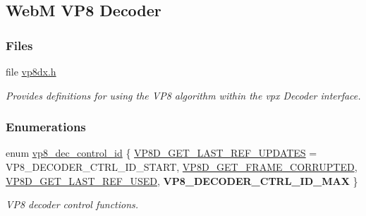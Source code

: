 \hypertarget{group__vp8__decoder}{\subsection{Web\-M V\-P8 Decoder}
\label{group__vp8__decoder}
}
\subsubsection*{Files}
\begin{DoxyCompactItemize}
\item 
file \hyperlink{vp8dx_8h}{vp8dx.\-h}
\begin{DoxyCompactList}\small\item\em Provides definitions for using the V\-P8 algorithm within the vpx Decoder interface. \end{DoxyCompactList}\end{DoxyCompactItemize}
\subsubsection*{Enumerations}
\begin{DoxyCompactItemize}
\item 
enum \hyperlink{group__vp8__decoder_gaf9dd3f2e6d1412106ee791af768e57c1}{vp8\-\_\-dec\-\_\-control\-\_\-id} \{ \hyperlink{group__vp8__decoder_ggaf9dd3f2e6d1412106ee791af768e57c1a0b6055c47120f28e3de959960ee0a02b}{V\-P8\-D\-\_\-\-G\-E\-T\-\_\-\-L\-A\-S\-T\-\_\-\-R\-E\-F\-\_\-\-U\-P\-D\-A\-T\-E\-S} = V\-P8\-\_\-\-D\-E\-C\-O\-D\-E\-R\-\_\-\-C\-T\-R\-L\-\_\-\-I\-D\-\_\-\-S\-T\-A\-R\-T, 
\hyperlink{group__vp8__decoder_ggaf9dd3f2e6d1412106ee791af768e57c1af9f82d9e7930e6a2244b30b031b79599}{V\-P8\-D\-\_\-\-G\-E\-T\-\_\-\-F\-R\-A\-M\-E\-\_\-\-C\-O\-R\-R\-U\-P\-T\-E\-D}, 
\hyperlink{group__vp8__decoder_ggaf9dd3f2e6d1412106ee791af768e57c1aa57d870ac8cf395fdc86da4a8939b10b}{V\-P8\-D\-\_\-\-G\-E\-T\-\_\-\-L\-A\-S\-T\-\_\-\-R\-E\-F\-\_\-\-U\-S\-E\-D}, 
{\bfseries V\-P8\-\_\-\-D\-E\-C\-O\-D\-E\-R\-\_\-\-C\-T\-R\-L\-\_\-\-I\-D\-\_\-\-M\-A\-X}
 \}
\begin{DoxyCompactList}\small\item\em V\-P8 decoder control functions. \end{DoxyCompactList}\end{DoxyCompactItemize}
